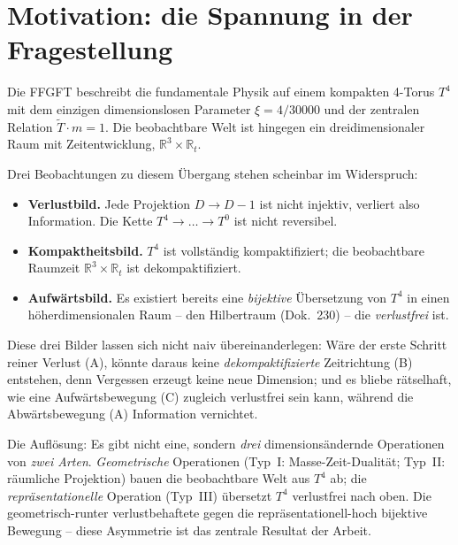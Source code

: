 \section{Motivation: die Spannung in der Fragestellung}

Die FFGFT beschreibt die fundamentale Physik auf einem kompakten 4-Torus $T^4$
mit dem einzigen dimensionslosen Parameter $\xi = 4/30000$ und der zentralen
Relation $\tilde{T}\cdot m = 1$. Die beobachtbare Welt ist hingegen ein
dreidimensionaler Raum mit Zeitentwicklung, $\mathbb{R}^3 \times \mathbb{R}_t$.

Drei Beobachtungen zu diesem \"Ubergang stehen scheinbar im Widerspruch:
\begin{itemize}
  \item[(A)] \textbf{Verlustbild.} Jede Projektion $D{\to}D{-}1$ ist nicht
  injektiv, verliert also Information. Die Kette $T^4 \to \dots \to T^0$ ist
  nicht reversibel.
  \item[(B)] \textbf{Kompaktheitsbild.} $T^4$ ist vollst\"andig kompaktifiziert;
  die beobachtbare Raumzeit $\mathbb{R}^3 \times \mathbb{R}_t$ ist
  dekompaktifiziert.
  \item[(C)] \textbf{Aufw\"artsbild.} Es existiert bereits eine \emph{bijektive}
  \"Ubersetzung von $T^4$ in einen h\"oherdimensionalen Raum -- den Hilbertraum
  (Dok.~230) -- die \emph{verlustfrei} ist.
\end{itemize}

Diese drei Bilder lassen sich nicht naiv \"ubereinanderlegen: W\"are der erste
Schritt reiner Verlust (A), k\"onnte daraus keine \emph{dekompaktifizierte}
Zeitrichtung (B) entstehen, denn Vergessen erzeugt keine neue Dimension; und es
bliebe r\"atselhaft, wie eine Aufw\"artsbewegung (C) zugleich verlustfrei sein
kann, w\"ahrend die Abw\"artsbewegung (A) Information vernichtet.

Die Aufl\"osung: Es gibt nicht eine, sondern \emph{drei} dimensions\"andernde
Operationen von \emph{zwei Arten}. \emph{Geometrische} Operationen (Typ~I:
Masse-Zeit-Dualit\"at; Typ~II: r\"aumliche Projektion) bauen die beobachtbare
Welt aus $T^4$ ab; die \emph{repr\"asentationelle} Operation (Typ~III)
\"ubersetzt $T^4$ verlustfrei nach oben. Die geometrisch-runter verlustbehaftete
gegen die repr\"asentationell-hoch bijektive Bewegung -- diese Asymmetrie ist das
zentrale Resultat der Arbeit.

